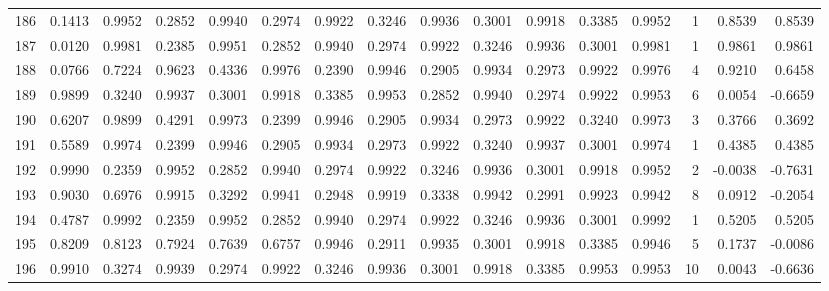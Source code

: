 \begin{tabular}{lrrrrrrrrrrrrrrr}
186 &      0.1413 &  0.9952 &  0.2852 &  0.9940 &  0.2974 &  0.9922 &  0.3246 &  0.9936 &  0.3001 &  0.9918 &   0.3385 &     0.9952 &      1 &                    0.8539 &                     0.8539 \\
187 &      0.0120 &  0.9981 &  0.2385 &  0.9951 &  0.2852 &  0.9940 &  0.2974 &  0.9922 &  0.3246 &  0.9936 &   0.3001 &     0.9981 &      1 &                    0.9861 &                     0.9861 \\
188 &      0.0766 &  0.7224 &  0.9623 &  0.4336 &  0.9976 &  0.2390 &  0.9946 &  0.2905 &  0.9934 &  0.2973 &   0.9922 &     0.9976 &      4 &                    0.9210 &                     0.6458 \\
189 &      0.9899 &  0.3240 &  0.9937 &  0.3001 &  0.9918 &  0.3385 &  0.9953 &  0.2852 &  0.9940 &  0.2974 &   0.9922 &     0.9953 &      6 &                    0.0054 &                    -0.6659 \\
190 &      0.6207 &  0.9899 &  0.4291 &  0.9973 &  0.2399 &  0.9946 &  0.2905 &  0.9934 &  0.2973 &  0.9922 &   0.3240 &     0.9973 &      3 &                    0.3766 &                     0.3692 \\
191 &      0.5589 &  0.9974 &  0.2399 &  0.9946 &  0.2905 &  0.9934 &  0.2973 &  0.9922 &  0.3240 &  0.9937 &   0.3001 &     0.9974 &      1 &                    0.4385 &                     0.4385 \\
192 &      0.9990 &  0.2359 &  0.9952 &  0.2852 &  0.9940 &  0.2974 &  0.9922 &  0.3246 &  0.9936 &  0.3001 &   0.9918 &     0.9952 &      2 &                   -0.0038 &                    -0.7631 \\
193 &      0.9030 &  0.6976 &  0.9915 &  0.3292 &  0.9941 &  0.2948 &  0.9919 &  0.3338 &  0.9942 &  0.2991 &   0.9923 &     0.9942 &      8 &                    0.0912 &                    -0.2054 \\
194 &      0.4787 &  0.9992 &  0.2359 &  0.9952 &  0.2852 &  0.9940 &  0.2974 &  0.9922 &  0.3246 &  0.9936 &   0.3001 &     0.9992 &      1 &                    0.5205 &                     0.5205 \\
195 &      0.8209 &  0.8123 &  0.7924 &  0.7639 &  0.6757 &  0.9946 &  0.2911 &  0.9935 &  0.3001 &  0.9918 &   0.3385 &     0.9946 &      5 &                    0.1737 &                    -0.0086 \\
196 &      0.9910 &  0.3274 &  0.9939 &  0.2974 &  0.9922 &  0.3246 &  0.9936 &  0.3001 &  0.9918 &  0.3385 &   0.9953 &     0.9953 &     10 &                    0.0043 &                    -0.6636 \\

\end{tabular}

